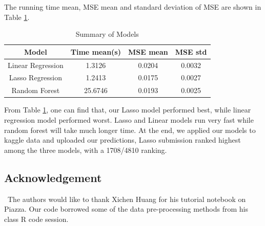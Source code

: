 \documentclass[12pt]{article}
\begin{document}
The running time mean, MSE mean and standard deviation of MSE are shown in Table \ref{result}.

\begin{table}[htb]
 \caption{Summary of Models} \label{result}
\begin{center}
  \begin{tabular}{  c  c c  c }
    \hline
    Model                             &Time mean(s)              & MSE mean    & MSE std \\ \hline
    Linear Regression           & 1.3126                               & 0.0204      & 0.0032 \\
    Lasso Regression                & 1.2413                          & 0.0175    & 0.0027 \\
    Random Forest                  & 25.6746                          & 0.0193          & 0.0025 \\
    \hline
  \end{tabular}
\end{center}
\end{table}

From Table \ref{result}, one can find that, our Lasso model performed best, while linear regression model performed worst. Lasso and Linear models run very fast while random forest will take much longer time. At the end, we applied our models to kaggle data and uploaded our predictions, Lasso submission ranked highest among the three models, with a 1708/4810 ranking.

\subsection*{Acknowledgement}

\quad\ The authors would like to thank Xichen Huang for his tutorial notebook on Piazza. Our code borrowed some of the data pre-processing methods from his class R code session.

\vfill\pagebreak

%
\end{document}
